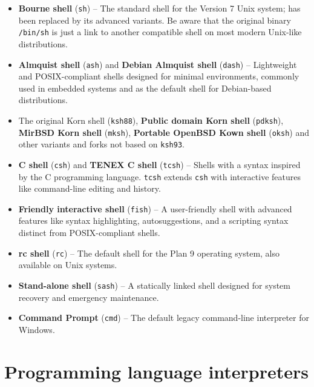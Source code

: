 \begin{itemize}

\item \textbf{Bourne shell} (\texttt{sh}) -- The standard shell for the Version 7 Unix system; has been replaced by its advanced variants. Be aware that the original binary \texttt{/bin/sh} is just a link to another compatible shell on most modern Unix-like distributions.

\item \textbf{Almquist shell} (\texttt{ash}) and \textbf{Debian Almquist shell} (\texttt{dash}) -- Lightweight and POSIX-compliant shells designed for minimal environments, commonly used in embedded systems and as the default shell for Debian-based distributions.

\item The original Korn shell (\texttt{ksh88}), \textbf{Public domain Korn shell} (\texttt{pdksh}), \textbf{MirBSD Korn shell} (\texttt{mksh}), \textbf{Portable OpenBSD Kown shell} (\texttt{oksh}) and other variants and forks not based on \texttt{ksh93}.

\item \textbf{C shell} (\texttt{csh}) and \textbf{TENEX C shell} (\texttt{tcsh}) -- Shells with a syntax inspired by the C programming language. \texttt{tcsh} extends \texttt{csh} with interactive features like command-line editing and history.

\item \textbf{Friendly interactive shell} (\texttt{fish}) -- A user-friendly shell with advanced features like syntax highlighting, autosuggestions, and a scripting syntax distinct from POSIX-compliant shells.

\item \textbf{rc shell} (\texttt{rc}) -- The default shell for the Plan 9 operating system, also available on Unix systems.

\item \textbf{Stand-alone shell} (\texttt{sash}) -- A statically linked shell designed for system recovery and emergency maintenance.

\item \textbf{Command Prompt} (\texttt{cmd}) -- The default legacy command-line interpreter for Windows.

\end{itemize}


\section{Programming language interpreters}
\label{sec:program-interpreters}

